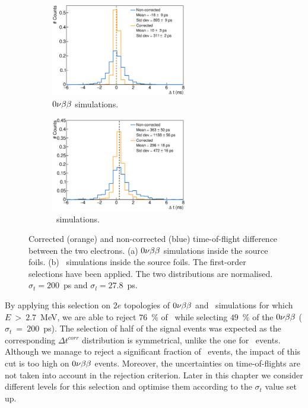 \begin{figure}[!h]
\centering
\begin{subfigure}[t]{1.\textwidth}
  \centering
  \includegraphics[width=0.65\textwidth]{timedifference/fig_timediff/0nubb_delta_t.eps}
  \captionsetup{justification=justified}
  \caption{$0\nu\beta\beta$ simulations.
    \label{subfig:0nubb_delta_t}}
\end{subfigure}
\hfill
\begin{subfigure}[t]{1.\textwidth}
  \centering
  \includegraphics[width=0.65\textwidth]{timedifference/fig_timediff/208Tl_delta_t.eps}
  \captionsetup{justification=justified}
  \caption{\Tl\ simulations.
    \label{subfig:208Tl_delta_t}}
\end{subfigure}
\caption{Corrected (orange) and non-corrected (blue) time-of-flight difference between the two electrons.
  (a) $0\nu\beta\beta$ simulations inside the source foils.
  (b) \Tl\ simulations inside the source foils.
  The first-order selections have been applied.
  The two distributions are normalised.
  $\sigma_{t}=200$~ps and $\sigma_{l}=27.8$~ps.
  \label{fig:delta_t}}
\end{figure}

By applying this selection on $2e$ topologies of $0\nu\beta\beta$ and \Tl\ simulations for which $E~>~2.7$~MeV, we are able to reject $76$~\% of \Tl\, while selecting $49$~\% of the $0\nu\beta\beta$ ($\sigma_{t}~=~200$~ps).
The selection of half of the signal events was expected as the corresponding $\Delta t^{corr}$ distribution is symmetrical, unlike the one for \Tl\ events.
Although we manage to reject a significant fraction of \Tl\ events, the impact of this cut is too high on $0\nu\beta\beta$ events.
Moreover, the uncertainties on time-of-flights are not taken into account in the rejection criterion.
Later in this chapter we consider different levels for this selection and optimise them according to the $\sigma_{t}$ value set up.


